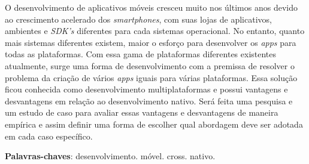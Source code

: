 \begin{resumo}
\begin{comment}
O resumo deve ressaltar o objetivo, o método, os resultados e as conclusões 
 do documento. A ordem e a extensão
 destes itens dependem do tipo de resumo (informativo ou indicativo) e do
 tratamento que cada item recebe no documento original. O resumo deve ser
 precedido da referência do documento, com exceção do resumo inserido no
 próprio documento. (\ldots) As palavras-chave devem figurar logo abaixo do
 resumo, antecedidas da expressão Palavras-chave:, separadas entre si por
 ponto e finalizadas também por ponto. O texto pode conter no mínimo 150 e 
 no máximo 500 palavras, é aconselhável que sejam utilizadas 200 palavras. 
 E não se separa o texto do resumo em parágrafos.
\end{comment}

 O desenvolvimento de aplicativos móveis cresceu muito nos últimos anos
 devido ao crescimento acelerado dos \textit{smartphones}, com suas 
 lojas de aplicativos, ambientes e \textit{SDK's} diferentes para 
 cada sistemas operacional. No entanto, quanto mais sistemas diferentes 
 existem, maior o esforço para desenvolver os \textit{apps} para todas 
 as plataformas. Com essa gama de plataformas diferentes existentes 
 atualmente, surge uma forma de desenvolvimento com a premissa de resolver 
 o problema da criação de vários \textit{apps} iguais para várias plataformas. 
 Essa solução ficou conhecida como desenvolvimento multiplataformas e possui
 vantagens e desvantagens em relação ao desenvolvimento nativo. Será feita uma
 pesquisa e um estudo de caso para avaliar essas vantagens e desvantagens de 
 maneira empírica e assim definir uma forma de escolher qual abordagem deve ser 
 adotada em cada caso específico. 

 \vspace{\onelineskip}
    
 \noindent
 \textbf{Palavras-chaves}: desenvolvimento. móvel. cross. nativo. 
\end{resumo}
